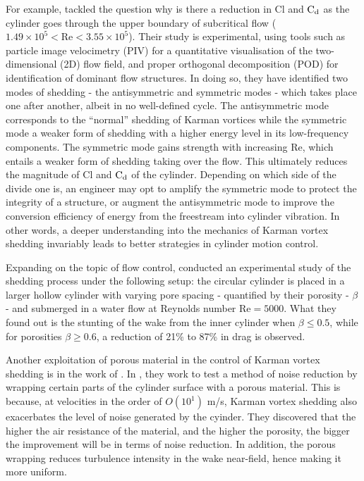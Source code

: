 \documentclass[oneside]{utmthesis}
\begin{document}
For example, \citet{Desai2020} tackled the question why is there a reduction in Cl and $\text{C}_{\text{d}}$ as the cylinder goes through the upper boundary of subcritical flow ($1.49 \times 10^{5} < \text{Re} < 3.55 \times 10^{5}$). Their study is experimental, using tools such as particle image velocimetry (PIV) for a quantitative visualisation of the two-dimensional (2D) flow field, and proper orthogonal decomposition (POD) for identification of dominant flow structures. In doing so, they have identified two modes of shedding - the antisymmetric and symmetric modes - which takes place one after another, albeit in no well-defined cycle. The antisymmetric mode corresponds to the ``normal'' shedding of Karman vortices while the symmetric mode a weaker form of shedding with a higher energy level in its low-frequency components. The symmetric mode gains strength with increasing Re, which entails a weaker form of shedding taking over the flow. This ultimately reduces the magnitude of Cl and $\text{C}_{\text{d}}$ of the cylinder. Depending on which side of the divide one is, an engineer may opt to amplify the symmetric mode to protect the integrity of a structure, or augment the antisymmetric mode to improve the conversion efficiency of energy from the freestream into cylinder vibration. In other words, a deeper understanding into the mechanics of Karman vortex shedding invariably leads to better strategies in cylinder motion control.

Expanding on the topic of flow control, \citet{Durhasan2019} conducted an experimental study of the shedding process under the following setup: the circular cylinder is placed in a larger hollow cylinder with varying pore spacing - quantified by their porosity - $\beta$ - and submerged in a water flow at Reynolds number $\text{Re} = 5000$. What they found out is the stunting of the wake from the inner cylinder when $\beta \leq 0.5$, while for porosities $\beta \geq 0.6$, a reduction of 21\% to 87\% in drag is observed.

Another exploitation of porous material in the control of Karman vortex shedding is in the work of \citet{Geyer2020}. In \citet{Geyer2020}, they work to test a method of noise reduction by wrapping certain parts of the cylinder surface with a porous material. This is because, at velocities in the order of $O(10^{1})$ m/s, Karman vortex shedding also exacerbates the level of noise generated by the cyinder. They discovered that the higher the air resistance of the material, and the higher the porosity, the bigger the improvement will be in terms of noise reduction. In addition, the porous wrapping reduces turbulence intensity in the wake near-field, hence making it more uniform.
\end{document}
